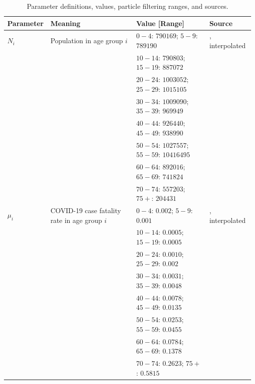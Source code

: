 \clearpage 

\begin{table}[H]
\tiny
  \caption{Parameter definitions, values, particle filtering ranges, and sources.}
  \begin{tabular}{llll}
  Parameter & Meaning & Value [Range] & Source \\
  \midrule
  $N_i$         & Population in age group $i$  & $0-4$:  $790169$; $5-9$: $789190 $ & \cite{ontario_census}, interpolated\\
                &   & $10-14$: $790803$; $15-19$: $887072$ &  \\
                &   & $20-24$: $1003052$; $25-29$: $1015105$ &  \\
                &   & $30-34$: $1009090$; $35-39$:  $969949$ &  \\
                &   & $40-44$:  $926440$; $45-49$:  $938990$ &  \\
                &   & $50-54$:   $1027557$; $55-59$: $10416495$ &  \\
                &   & $60-64$:  $892016$; $65-69$:  $741824$ &  \\
                &   & $70-74$:  $557203$; $75+$:  $204431$ &  \\
  
  $\mu_i$       & COVID-19 case fatality rate in age group $i$  & $0-4$: $0.002$; $5-9$: $0.001$  & \cite{publichealthontario}, interpolated\\
                &   & $10-14$:   $0.0005$; $15-19$:  $0.0005$ &  \\
                &   & $20-24$:  $0.0010$; $25-29$:   $0.002$ &  \\
                &   & $30-34$:  $0.0031$; $35-39$:   $0.0048$ &  \\
                &   & $40-44$:   $0.0078$; $45-49$:   $0.0135$  \\
                &   & $50-54$:    $0.0253$; $55-59$:   $0.0455$ &  \\
                &   & $60-64$:   $0.0784$; $65-69$:  $0.1378$ &  \\
                &   & $70-74$:  $0.2623$; $75+$:   $0.5815$ &  \\
                

\end{tabular}
\end{table}
